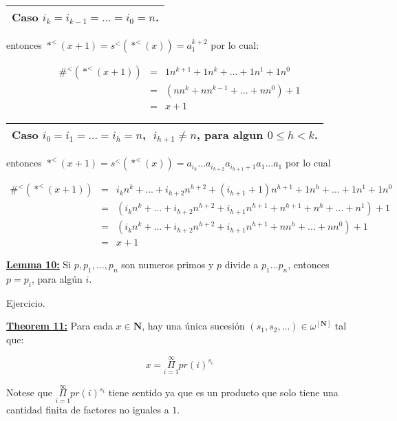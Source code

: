     \begin{tabular}{|c|}
      \hline Caso $i_{k}=i_{k-1}=...=i_{0}=n$.\\\hline
    \end{tabular}
    entonces $\ast^{<}(x+1) = s^{<}(\ast^{<}(x)) = a_{1}^{k+2}$ por lo cual:

    \begin{eqnarray}
      \nonumber \#^{<}(\ast^{<}(x+1)) &=& 1 n^{k+1} + 1 n^{k} + ... + 1 n^{1} + 1 n^{0} \\
      \nonumber &=& (n n^{k} + n n^{k-1} + ... + n n^{0}) + 1 \\
      \nonumber &=& x + 1
    \end{eqnarray}

    \begin{tabular}{|c|}
      \hline Caso $i_{0}=i_{1}=...=i_{h}=n$, $\;i_{h+1}\not=n$, para algun $ 0\leq h< k$.\\\hline
    \end{tabular}
    entonces $\ast^{<}(x+1) = s^{<}(\ast^{<}(x)) = a_{i_{k}} ... a_{i_{h+2}} a_{i_{h+1}+1} a_{1} ... a_{1}$ por lo cual

    \begin{eqnarray}
      \nonumber \#^{<}(\ast^{<}(x+1)) &=& i_{k} n^{k} + ... + i_{h+2} n^{h+2} + (i_{h+1} + 1) n^{h+1} + 1 n^{h} + ... +
      1 n^{1} + 1 n^{0} \\
      \nonumber &=& (i_{k} n^{k} + ... + i_{h+2} n^{h+2} + i_{h+1} n^{h+1} + n^{h+1} + n^{h} + ... + n^{1}) +1 \\
      \nonumber &=& (i_{k} n^{k} + ... + i_{h+2} n^{h+2} + i_{h+1} n^{h+1} + n n^{h} + ... + n n^{0}) +1 \\
      \nonumber &=& x + 1
    \end{eqnarray}

  \QED


  \textbf{\underline{Lemma 10:}} Si $p, p_{1}, ..., p_{n}$ son numeros primos y $p$ divide a $p_{1}...p_{n}$, entonces
    $p=p_{i}$, para algún $i$.

  \PROOF Ejercicio.

  \QED


  \textbf{\underline{Theorem 11:}} Para cada $x \in \mathbf{N}$, hay una única sucesión $(s_{1}, s_{2}, ...) \in
    \omega^{\left[\mathbf{N}\right]}$ tal que:

    \[
      x = \underset{i=1}{\overset{\infty}{\Pi}} pr(i)^{s_{i}}
    \]

    \par Notese que $\underset{i=1}{\overset{\infty}{\Pi}} pr(i)^{s_{i}}$ tiene sentido ya que es un producto que solo
    tiene una cantidad finita de factores no iguales a $1$.

